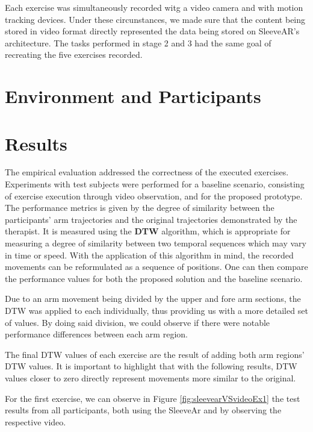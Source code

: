 Each exercise was simultaneously recorded witg a video camera and with motion tracking devices. Under these circunstances, we made sure that the content being stored in video format directly represented the data being stored on SleeveAR's architecture.
The tasks performed in stage 2 and 3 had the same goal of recreating the five exercises recorded.


\section{Environment and Participants} 



\section{Results}
\label{sec:results}

The empirical evaluation addressed the correctness of the executed exercises. Experiments with test subjects were performed for a baseline scenario, consisting of exercise execution through video observation, and for the proposed prototype. The performance metrics is given by the degree of similarity between the participants' arm trajectories and the original trajectories demonstrated by the therapist. It is measured using the \textbf{\ac{DTW}}  algorithm, 
which is appropriate for measuring a degree of similarity between two temporal sequences which may vary in time or speed. With the application of this algorithm in mind, the recorded movements can be reformulated as a sequence of positions. One can then compare the performance values for both the proposed solution and the baseline scenario.

Due to an arm movement being divided by the upper and fore arm sections, the \ac{DTW} was applied to each individually, thus providing us with a more detailed set of values. By doing said division, we could observe if there were notable performance differences between each arm region.

The final \ac{DTW} values of each exercise are the result of adding both arm regions' DTW values. It is important to highlight that with the following results, DTW values closer to zero directly represent movements more similar to the original.

For the first exercise, we can observe in Figure \ref{fig:sleevearVSvideoEx1} the test results from all participants, both using the SleeveAr and by observing the respective video.

